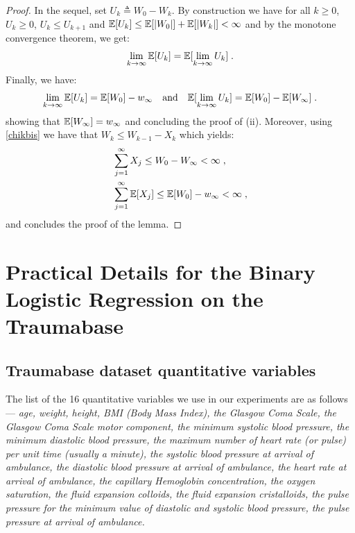 \documentclass[final,12pt]{alt2022} %
\begin{document}
\begin{proof}
In the sequel, set $U_k \triangleq W_0 - W_k$. By construction we have for all $k \geq 0$, $U_k \geq 0$, $U_k \leq U_{k+1}$ and $\EE[U_k] \leq \EE[|W_0|] + \EE[|W_k|] < \infty$ and by the monotone convergence theorem, we get:
\begin{equation}
    \lim \limits_{k \to \infty} \EE[U_k] = \EE[\lim \limits_{k \to \infty}U_k]\eqsp.
\end{equation}
Finally, we have:
\begin{equation}
\lim \limits_{k \to \infty} \EE[U_k] = \EE[W_0] - w_{\infty} \quad \textrm{and} \quad \EE[\lim \limits_{k \to \infty}U_k] = \EE[W_0] - \EE[W_{\infty}] \eqsp.
\end{equation}
showing that $\EE[W_{\infty}] = w_{\infty}$ and concluding the proof of (ii). Moreover, using \eqref{chikbis} we have that $W_k \leq W_{k-1} - X_k$ which yields:
\begin{equation}
\begin{split}
    & \sum_{j=1}^{\infty}{X_j} \leq W_{0} - W_{\infty} < \infty \eqsp,\\
    & \sum_{j=1}^{\infty}{\EE[X_j]} \leq \EE[W_{0}] - w_{\infty} < \infty\eqsp,
\end{split}
\end{equation}
and concludes the proof of the lemma.
\end{proof}



\clearpage

 \section{Practical Details for the Binary Logistic Regression on the Traumabase}\label{app:logistic}
 
 \subsection{Traumabase dataset quantitative variables}\label{appendix:variables}
  The list of the 16 quantitative variables we use in our experiments are as follows --- \textit{age, weight, height, BMI (Body Mass Index), the Glasgow Coma Scale, the Glasgow Coma Scale motor component, the minimum systolic blood pressure, the minimum diastolic blood pressure, the maximum number of heart rate (or pulse) per unit time (usually a minute), the systolic blood pressure at arrival of ambulance, the diastolic blood pressure at arrival of ambulance, the heart rate at arrival of ambulance, the capillary Hemoglobin concentration, the oxygen saturation, the fluid expansion colloids, the fluid expansion cristalloids, the pulse pressure for the minimum value of diastolic and systolic blood pressure, the pulse pressure at arrival of ambulance.}
\end{document}
